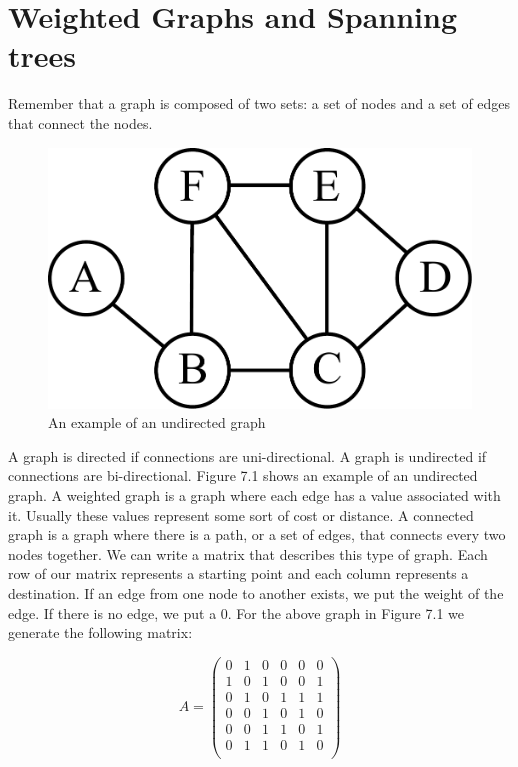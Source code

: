 
\label{Ch:Kruskal}


\section*{Weighted Graphs and Spanning trees}

Remember that a graph is composed of two sets: a set of nodes and a set of edges that connect the nodes.

\begin{figure}[H]
\includegraphics[width = .4\textwidth]{graph1.pdf}
\caption{An example of an undirected graph}
\label{mst:graph1}
\end{figure}

A graph is directed if connections are uni-directional.
A graph is undirected if connections are bi-directional.
Figure 7.1 shows an example of an undirected graph.
A weighted graph is a graph where each edge has a value associated with it.
Usually these values represent some sort of cost or distance.
A connected graph is a graph where there is a path, or a set of edges, that connects every two nodes together.
We can write a matrix that describes this type of graph.
Each row of our matrix represents a starting point and each column represents a destination.
If an edge from one node to another exists, we put the weight of the edge.
If there is no edge, we put a 0.
For the above graph in Figure 7.1 we generate the following matrix:

\[
A = \begin{pmatrix}
0 & 1 & 0 & 0 & 0 & 0\\
1 & 0 & 1 & 0 & 0 & 1\\
0 & 1 & 0 & 1 & 1 & 1\\
0 & 0 & 1 & 0 & 1 & 0\\
0 & 0 & 1 & 1 & 0 & 1\\
0 & 1 & 1 & 0 & 1 & 0\\
\end{pmatrix}
\]

